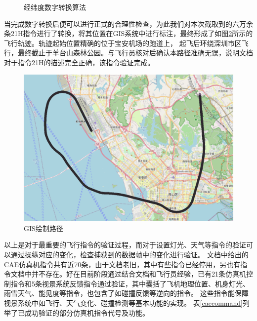 \begin{figure}[h!]
    \centering
     
    \caption{经纬度数字转换算法}
    \label{llconv}
\end{figure}
\par
当完成数字转换后便可以进行正式的合理性检查，为此我们对本次截取到的六万余条21H指令进行了转换，将其位置在GIS系统中进行标注，最终形成了如图\ref{GIStrace}所示的飞行轨迹。轨迹起始位置精确的位于宝安机场的跑道上，
起飞后环绕深圳市区飞行，最终截止于羊台山森林公园。与飞行员核对后确认本路径准确无误，说明文档对于指令21H的描述完全正确，该指令验证完成。
\begin{figure}[h!]
    \begin{center}
        \includegraphics[width=.9\textwidth]{pictures/trace.png}
        \caption{GIS绘制路径}
        \label{GIStrace}
    \end{center}
\end{figure}
\par
以上是对于最重要的飞行指令的验证过程，而对于设置灯光、天气等指令的验证可以通过操纵对应的变化，检查捕获到的数据帧中的变化进行验证。
文档中给出的CAE仿真机指令共有近70条，由于文档老旧，其中有些指令已经停用，另也有指令文档中并不存在。好在目前阶段通过结合文档和飞行员经验，已有21条仿真机控制指令和5条视景系统反馈指令通过验证，其中囊括了飞机地理位置、机身灯光、雨雪天气、能见度等指令，也包含了如碰撞反馈等逆向的指令。
这些指令能保障视景系统中如飞行、天气变化、碰撞检测等基本功能的实现。
表\ref{caecommand}列举了已成功验证的部分仿真机指令代号及功能。

